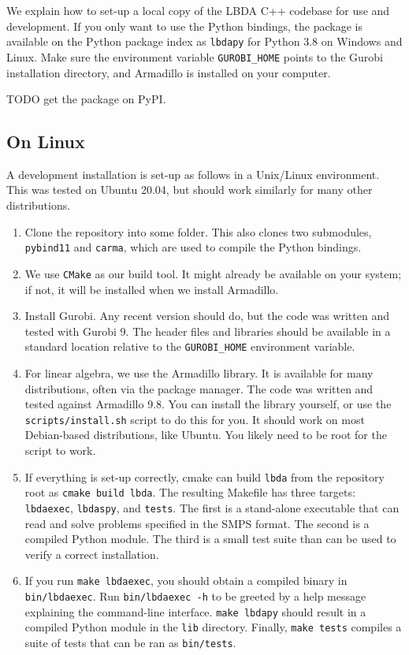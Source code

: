 \documentclass[12pt, english]{article}
\begin{document}
We explain how to set-up a local copy of the LBDA C++ codebase for use and development. If you only want to use the Python bindings, the package is available on the Python package index as \texttt{lbdapy} for Python 3.8 on Windows and Linux. Make sure the environment variable \texttt{GUROBI\_HOME} points to the Gurobi installation directory, and Armadillo is installed on your computer. 

TODO get the package on PyPI.  

\subsection{On Linux}
A development installation is set-up as follows in a Unix/Linux environment. This was tested on Ubuntu 20.04, but should work similarly for many other distributions.
\begin{enumerate}
	\item Clone the repository into some folder. This also clones two submodules, \texttt{pybind11} and \texttt{carma}, which are used to compile the Python bindings.
	
	\item We use \texttt{CMake} as our build tool. It might already be available on your system; if not, it will be installed when we install Armadillo.
	
	\item Install Gurobi. Any recent version should do, but the code was written and tested with Gurobi 9. The header files and libraries should be available in a standard location relative to the \texttt{GUROBI\_HOME} environment variable.
	
	\item For linear algebra, we use the Armadillo library. It is available for many distributions, often via the package manager. The code was written and tested against Armadillo 9.8. You can install the library yourself, or use the \texttt{scripts/install.sh} script to do this for you. It should work on most Debian-based distributions, like Ubuntu. You likely need to be root for the script to work.
	
	\item If everything is set-up correctly, cmake can build \texttt{lbda} from the repository root as \texttt{cmake build lbda}. The resulting Makefile has three targets: \texttt{lbdaexec}, \texttt{lbdaspy}, and \texttt{tests}. The first is a stand-alone executable that can read and solve problems specified in the SMPS format. The second is a compiled Python module. The third is a small test suite than can be used to verify a correct installation.
	
	\item If you run \texttt{make lbdaexec}, you should obtain a compiled binary in \texttt{bin/lbdaexec}. Run \texttt{bin/lbdaexec -h} to be greeted by a help message explaining the command-line interface. \texttt{make lbdapy} should result in a compiled Python module in the \texttt{lib} directory. Finally, \texttt{make tests} compiles a suite of tests that can be ran as \texttt{bin/tests}.
\end{enumerate}
\end{document}

